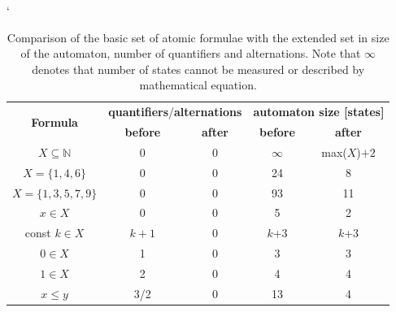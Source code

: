  \begin{table}
  \catcode`
 \begin{center}
  \begin{tabular}{|c|c|c|c|c|}
  \hline  
     \multirow{2}{*}{\textbf{Formula}}          
                    &\multicolumn{2}{c|}{\textbf{quantifiers}/\textbf{alternations}}&\multicolumn{2}{c|}{\textbf{automaton
                    size [states]}}\\
    \cline{2-5}
     & \textbf{before}     &    \textbf{after}    &
    \textbf{before}     &    \textbf{after}\\
    \hline
    \hline
    $X \subseteq \mathbb{N}$ & 0 & 0 & $\infty$ & max($X$)$ + 2$\\
    \hline
    $X = \{1, 4, 6\}$ & 0 & 0 & 24 & 8\\
    \hline
    $X = \{1, 3, 5, 7, 9\}$ & 0 & 0 & 93 & 11\\
    \hline
    \hline
    $x \in X$ & 0 & 0 & 5 & 2\\
    \hline
    const $k \in X$ & $k+1$ & 0 & $k$+3 & $k$+3\\
    \hline
    $0 \in X$ & 1 & 0 & 3 & 3\\
    \hline
    $1 \in X$ & 2 & 0 & 4 & 4\\
    \hline
    \hline
    $x \leq y$ & 3/2 & 0 & 13 & 4\\
    \hline
  \end{tabular}
 \end{center}
 \caption{Comparison of the basic set of atomic formulae with the extended set
 in size of the automaton, number of quantifiers and alternations. Note that $\infty$
 denotes that number of states cannot be measured or described by mathematical
 equation.}\label{atomic-formulae}
 \end{table}
 \newpage
 \noindent\hrulefill
